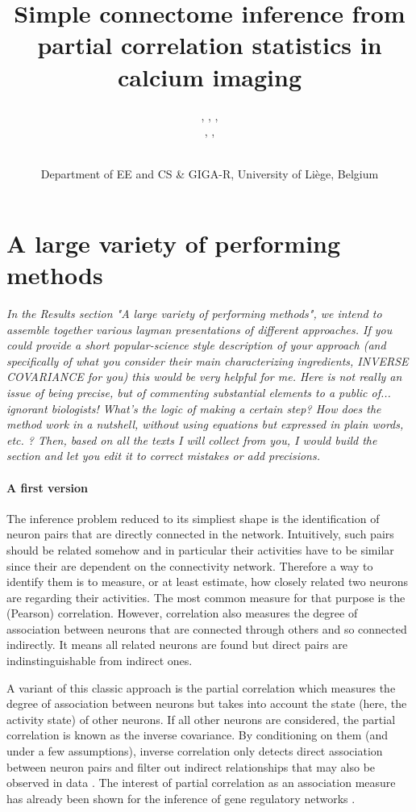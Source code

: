 \documentclass[wcp]{jmlr}
\title{Simple connectome inference from partial correlation statistics in calcium imaging}
\author{\Name{Antonio Sutera},
   \Name{Arnaud Joly},
   \Name{Vincent François-Lavet}, \Email{a.sutera@ulg.ac.be}\\
   \Name{Zixiao Aaron Qiu},
   \Name{Gilles Louppe},
   \Name{Damien Ernst}\and\Name{Pierre Geurts}
    \\
   \addr Department of EE and CS \& GIGA-R, University of Li\`ege, Belgium}
\begin{document}
\section{A large variety of performing methods}

\emph{
In the Results section "A large variety of performing methods", we intend to
assemble together various layman presentations of different approaches. If you
could provide a short popular-science style description of your approach (and
specifically of what you consider their main characterizing ingredients,
INVERSE COVARIANCE for you) this would be very helpful for me.  Here is not
really an issue of being precise, but of commenting substantial elements to a
public of... ignorant biologists! What's the logic of making a certain step?
How does the method work in a nutshell, without using equations but expressed
in plain words, etc. ? Then, based on all the texts I will collect from you, I
would build the section and let you edit it to correct mistakes or add
precisions.\\
}

\paragraph{A first version}
The inference problem reduced to its simpliest shape is the identification of
neuron pairs that are directly connected in the network. Intuitively, such
pairs should be related somehow and in particular their activities have to be
similar since their are dependent on the connectivity network. Therefore a way
to identify them is to measure, or at least estimate, how closely related two
neurons are regarding their activities. The most common measure for that
purpose is the (Pearson) correlation.  However, correlation also measures the
degree of association between neurons that are connected through others and so 
connected indirectly. It means all related neurons are found but direct pairs
are indinstinguishable from indirect ones.

A variant of this classic approach is the partial correlation which measures
the degree of association between neurons but takes into account the state
(here, the activity state) of other neurons. If all other neurons are
considered, the partial correlation is known as the inverse covariance. By
conditioning on them (and under a few assumptions), inverse correlation only
detects direct association between neuron pairs and filter out indirect
relationships that may also be observed in data \citep{sutera2014simple}. The
interest of partial correlation as an association measure has already been
shown for the inference of gene regulatory networks \citep{de2004discovery,Schafer:2005}.
\end{document}

